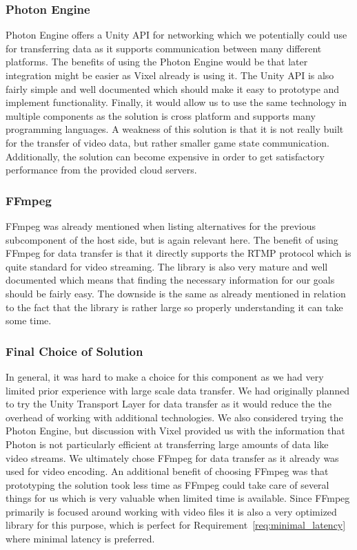 \subsubsection{Photon Engine}
Photon Engine\cite{photon_homepage} offers a Unity API for networking which we potentially could use for transferring data as it supports communication between many different platforms. The benefits of using the Photon Engine would be that later integration might be easier as Vixel already is using it. The Unity API is also fairly simple and well documented which should make it easy to prototype and implement functionality.
Finally, it would allow us to use the same technology in multiple components as the solution is cross platform and supports many programming languages. A weakness of this solution is that it is not really built for the transfer of video data, but rather smaller game state communication. Additionally, the solution can become expensive in order to get satisfactory performance from the provided cloud servers. 

\subsubsection{FFmpeg}
FFmpeg was already mentioned when listing alternatives for the previous subcomponent of the host side, but is again relevant here. The benefit of using FFmpeg for data transfer is that it directly supports the RTMP protocol which is quite standard for video streaming. The library is also very mature and well documented which means that finding the necessary information for our goals should be fairly easy. The downside is the same as already mentioned in relation to the fact that the library is rather large so properly understanding it can take some time. 

\subsubsection{Final Choice of Solution}
In general, it was hard to make a choice for this component as we had very limited prior experience with large scale data transfer. We had originally planned to try the Unity Transport Layer for data transfer as it would reduce the the overhead of working with additional technologies. We also considered trying the Photon Engine, but discussion with Vixel provided us with the information that Photon is not particularly efficient at transferring large amounts of data like video streams. We ultimately chose FFmpeg for data transfer as it already was used for video encoding. An additional benefit of choosing FFmpeg was that prototyping the solution took less time as FFmpeg could take care of several things for us which is very valuable when limited time is available. Since FFmpeg primarily is focused around working with video files it is also a very optimized library for this purpose, which is perfect for Requirement~\ref{req:minimal_latency} where minimal latency is preferred. 

